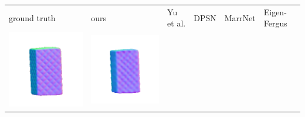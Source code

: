 \begin{center}
\begin{tabularx}{\linewidth}{@{}Y@{}Y@{}Y@{}Y@{}Y@{}Y@{}}
ground truth & ours & Yu et al. & DPSN & MarrNet & Eigen-Fergus \\
\includegraphics[width=\linewidth]{semisynthetic/20160617_18_gt.png} &
\includegraphics[width=\linewidth]{semisynthetic/20160617_18_ours_out.png} &

\end{tabularx}
\end{center}
